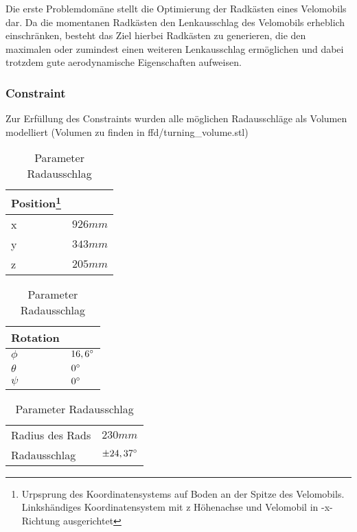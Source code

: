 Die erste Problemdomäne stellt die Optimierung der Radkästen eines Velomobils dar.
Da die momentanen Radkästen den Lenkausschlag des Velomobils erheblich einschränken, besteht das Ziel hierbei Radkästen zu generieren, die den maximalen oder zumindest einen weiteren Lenkausschlag ermöglichen und dabei trotzdem gute aerodynamische Eigenschaften aufweisen.

\subsubsection{Constraint}
Zur Erfüllung des Constraints wurden alle möglichen Radausschläge als Volumen modelliert (Volumen zu finden in ffd/turning\_volume.stl)

\begin{table}[h]
	\begin{tabularx}{.5\textwidth}{ll}\hline
		
		Position\footnote{Urpsprung des Koordinatensystems auf Boden an der Spitze des Velomobils. Linkshändiges Koordinatensystem mit z Höhenachse und Velomobil in -x-Richtung ausgerichtet} & \\
		\hline
		x &	$926mm$ \\
		y &	$343mm$ \\
		z &	$205mm$	\\
	\end{tabularx}
	\begin{tabularx}{.5\textwidth}{ll}\hline
		Rotation & \\ \hline
		$\phi$ & $16,6\degree$ \\
		$\theta$ & $0\degree$ \\
		$\psi$ & $0\degree$ \\
	\end{tabularx}
	\begin{tabularx}{.5\linewidth}{ll}
		Radius des Rads & $230mm$ \\
		
		Radausschlag & $\pm24,37\degree$\\
		
	\end{tabularx}

\label{tab:wheel_params}
\caption{Parameter Radausschlag}
\end{table}

